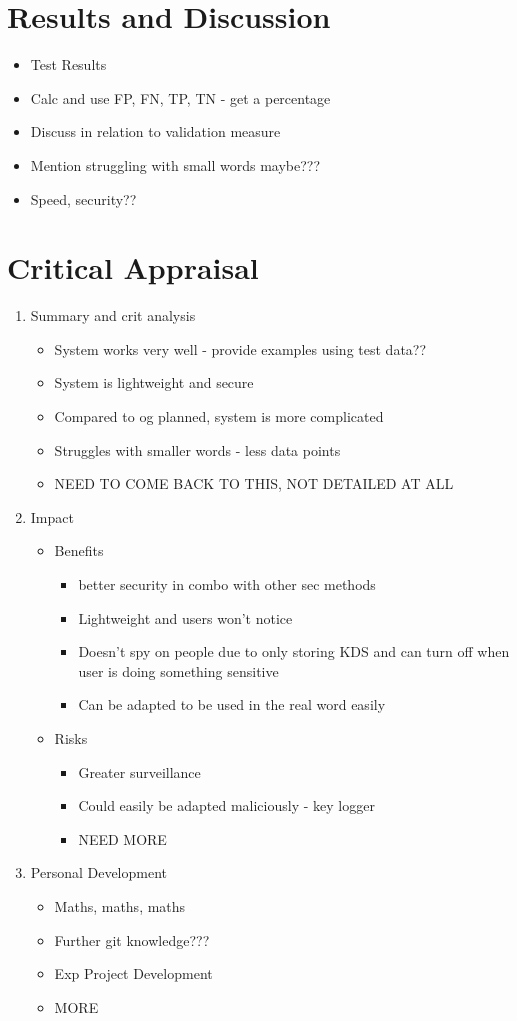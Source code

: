 \documentclass[10pt,a4paper]{report}
\begin{document}
\chapter{Results and Discussion}
\begin{itemize}
	\item Test Results
	\item Calc and use FP, FN, TP, TN - get a percentage
	\item Discuss in relation to validation measure
	\item Mention struggling with small words maybe???
	\item Speed, security??
\end{itemize}
\chapter{Critical Appraisal}
\begin{enumerate}
	\item Summary and crit analysis
	\begin{itemize}
		\item System works very well - provide examples using test data??
		\item System is lightweight and secure
		\item Compared to og planned, system is more complicated
		\item Struggles with smaller words - less data points
		\item NEED TO COME BACK TO THIS, NOT DETAILED AT ALL
	\end{itemize}
	\item Impact
	\begin{itemize}
		\item Benefits 
		\begin{itemize}
			\item better security in combo with other sec methods
			\item Lightweight and users won't notice
			\item Doesn't spy on people due to only storing KDS and can turn off when user is doing something sensitive
			\item Can be adapted to be used in the real word easily
		\end{itemize}
		\item Risks
		\begin{itemize}
			\item Greater surveillance
			\item Could easily be adapted maliciously - key logger
			\item NEED MORE
		\end{itemize}
	\end{itemize}
	\item Personal Development
	\begin{itemize}
		\item Maths, maths, maths
		\item Further git knowledge???
		\item Exp Project Development
		\item MORE
	\end{itemize}
\end{enumerate}
\end{document}
